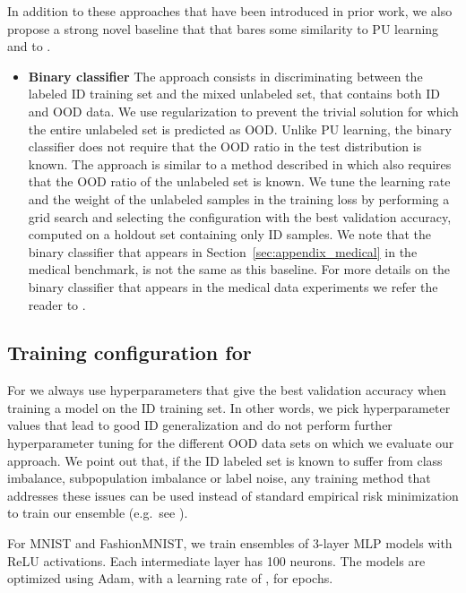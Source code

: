 In addition to these approaches that have been introduced in prior work, we also
propose a strong novel baseline that
that bares some similarity to PU learning and to . 

\begin{itemize}

 \item \textbf{Binary classifier} The approach consists in discriminating
   between the labeled ID training set and the mixed unlabeled set, that
   contains both ID and OOD data. We use regularization to prevent the trivial
   solution for which the entire unlabeled set is predicted as OOD. Unlike PU
   learning, the binary classifier does not require that the OOD ratio in the
   test distribution is known. The approach is similar to a method described in
   \citep{scott08} which also requires that the OOD ratio of the unlabeled set is
   known.  We tune the learning rate and the weight of the unlabeled samples in
   the training loss by performing a grid search and selecting the configuration
   with the best validation accuracy, computed on a holdout set containing only
   ID samples.  We note that the binary classifier that appears in
   Section~\ref{sec:appendix_medical} in the medical benchmark, is not the same
   as this baseline. For more details on the binary classifier that appears in
   the medical data experiments we refer the reader to \citet{Cao2020}.

\end{itemize}

\vspace{-0.2cm}
\subsection{Training configuration for }

For  we always use hyperparameters that give the best validation
accuracy when training a model on the ID training set. In other words, we pick
hyperparameter values that lead to good ID generalization and do not perform
further hyperparameter tuning for the different OOD data sets on which we
evaluate our approach. We point out that, if the ID labeled set is known to
suffer from class imbalance, subpopulation imbalance or label noise, any
training method that addresses these issues can be used instead of standard
empirical risk minimization to train our ensemble (e.g.\ see 
\citet{mahdi}).

For MNIST and FashionMNIST, we train ensembles of 3-layer MLP models with ReLU
activations. Each intermediate layer has 100 neurons. The models are optimized
using Adam, with a learning rate of , for  epochs.

